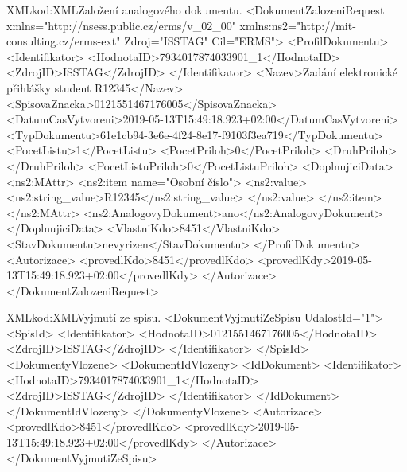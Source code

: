 \documentclass[
  master,
  field=ainfp,
  biblatex,
  language=czech,
  glossaries,
  theorems=false,
  index
]{kidiplom}
\begin{document}
\begin{kicode}{XML}{kod:XML}{Založení analogového dokumentu.}
<DokumentZalozeniRequest xmlns="http://nsess.public.cz/erms/v_02_00" 
    xmlns:ns2="http://mit-consulting.cz/erms-ext" Zdroj="ISSTAG" Cil="ERMS">
    <ProfilDokumentu>
        <Identifikator>
            <HodnotaID>7934017874033901_1</HodnotaID>
            <ZdrojID>ISSTAG</ZdrojID>
        </Identifikator>
        <Nazev>Zadání elektronické přihlášky student R12345</Nazev>
        <SpisovaZnacka>0121551467176005</SpisovaZnacka>
        <DatumCasVytvoreni>2019-05-13T15:49:18.923+02:00</DatumCasVytvoreni>
        <TypDokumentu>61e1cb94-3e6e-4f24-8e17-f9103f3ea719</TypDokumentu>
        <PocetListu>1</PocetListu>
        <PocetPriloh>0</PocetPriloh>
        <DruhPriloh></DruhPriloh>
        <PocetListuPriloh>0</PocetListuPriloh>
        <DoplnujiciData>
            <ns2:MAttr>
                <ns2:item name="Osobní číslo">
                    <ns2:value>
                        <ns2:string_value>R12345</ns2:string_value>
                    </ns2:value>
                </ns2:item>
            </ns2:MAttr>
            <ns2:AnalogovyDokument>ano</ns2:AnalogovyDokument>
        </DoplnujiciData>
        <VlastniKdo>8451</VlastniKdo>
        <StavDokumentu>nevyrizen</StavDokumentu>
    </ProfilDokumentu>
    <Autorizace>
        <provedlKdo>8451</provedlKdo>
        <provedlKdy>2019-05-13T15:49:18.923+02:00</provedlKdy>
    </Autorizace>
</DokumentZalozeniRequest>
\end{kicode}

\begin{kicode}{XML}{kod:XML}{Vyjmutí ze spisu.}
<DokumentVyjmutiZeSpisu UdalostId="1">
    <SpisId>
        <Identifikator>
            <HodnotaID>0121551467176005</HodnotaID>
            <ZdrojID>ISSTAG</ZdrojID>
        </Identifikator>
    </SpisId>
    <DokumentyVlozene>
        <DokumentIdVlozeny>
            <IdDokument>
                <Identifikator>
                    <HodnotaID>7934017874033901_1</HodnotaID>
                    <ZdrojID>ISSTAG</ZdrojID>
                </Identifikator>
            </IdDokument>
        </DokumentIdVlozeny>
    </DokumentyVlozene>
    <Autorizace>
        <provedlKdo>8451</provedlKdo>
        <provedlKdy>2019-05-13T15:49:18.923+02:00</provedlKdy>
    </Autorizace>
</DokumentVyjmutiZeSpisu>
\end{kicode}
\end{document}
